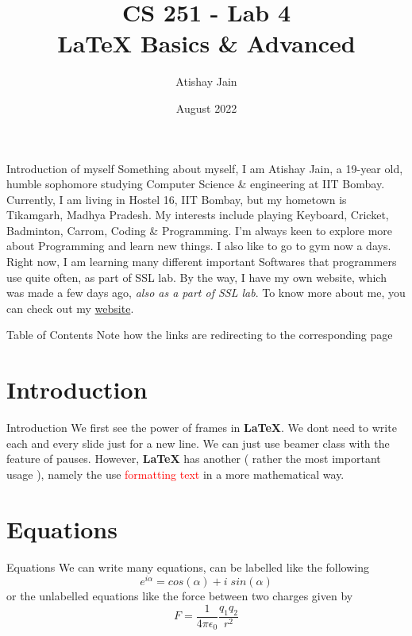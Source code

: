 \documentclass{beamer}
\title[\LaTeX \hspace{0.2ex} Basics \& Advanced] 
{CS 251 - Lab 4 \\ \LaTeX \hspace{0.2ex} Basics \& Advanced}
\author[ATISHAY JAIN] 
{Atishay Jain}
\institute[IITB] 
{
  IIT Bombay
}
\date[\hspace{2 cm}2022]
{August 2022}
\begin{document}
\frame{\titlepage}

\begin{frame}{Introduction of myself}
    Something about myself, I am Atishay Jain, a 19-year old, humble sophomore studying Computer Science \& engineering at IIT Bombay. Currently, I am living in Hostel 16, IIT Bombay, but my hometown is Tikamgarh, Madhya Pradesh. My interests include playing Keyboard, Cricket, Badminton, Carrom, Coding \& Programming. I'm always keen to explore more about Programming and learn new things. I also like to go to gym now a days. Right now, I am learning many different important Softwares that programmers use quite often, as part of SSL lab. By the way, I have my own website, which was made a few days ago, \textit{also as a part of SSL lab}. To know more about me, you can check out my \href{https://www.cse.iitb.ac.in/~atishay/}{website}. 
\end{frame}

\begin{frame}{Table of Contents}
    \tableofcontents
    Note how the links are redirecting to the corresponding page
\end{frame}

\section{Introduction}
\begin{frame}{Introduction}
    We first see the power of frames in \textbf{\LaTeX}. We dont need to write each and every slide just for a new line.
    \pause
    We can just use beamer class with the feature of pauses.
    \pause
    However, \textbf{\LaTeX} has another ( rather the most important usage ), namely the use \textcolor{red}{formatting text} in a more mathematical way.
\end{frame}

\section{Equations}
\begin{frame}{Equations}
    We can write many equations, can be labelled like the following
    \begin{equation}
        e^{i\alpha} = cos(\alpha) + i \; sin(\alpha)
    \end{equation}
    \pause
    or the unlabelled equations like the force between two charges given by
    \begin{equation*}
        F = \frac{1}{4\pi\epsilon_0}\frac{q_1q_2}{r^2}
    \end{equation*}
\end{frame}
\end{document}
